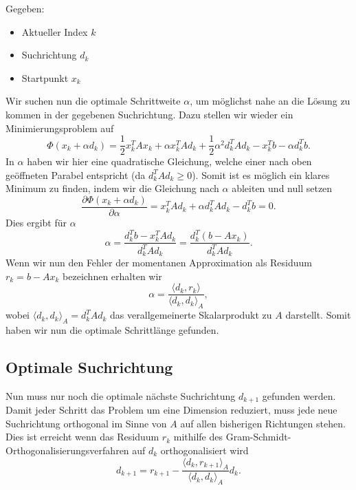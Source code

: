 Gegeben: 
\begin{itemize}
	\item Aktueller Index $k$
	\item Suchrichtung $d_k$
	\item Startpunkt $x_k$
\end{itemize}
Wir suchen nun die optimale Schrittweite $\alpha$, um möglichst nahe an die Lösung zu kommen in der gegebenen Suchrichtung.
Dazu stellen wir wieder ein Minimierungsproblem auf
\begin{equation}
	\Phi(x_k + \alpha d_k) 
	= 
	\frac{1}{2} x_k^T A x_k + \alpha x_k^T A d_k + \frac{1}{2} {\alpha}^2 d_k^T A d_k
	-
	x_k^T b - \alpha d_k^T b .
\end{equation}
In $\alpha$ haben wir hier eine quadratische Gleichung, welche einer nach oben geöffneten Parabel entspricht (da $d_k^T A d_k \ge 0$).
Somit ist es möglich ein klares Minimum zu finden, indem wir die Gleichung nach $\alpha$ ableiten und null setzen
\begin{equation}
\frac{\partial \Phi(x_k + \alpha d_k) }{\partial \alpha}
= 
x_k^T A d_k + \alpha  d_k^T A d_k - d_k^T b
=
0 .
\end{equation}
Dies ergibt für $\alpha$ 
\begin{equation}
\alpha
= 
\frac{d_k^T b - x_k^T A d_k}{d_k^T A d_k}
=
\frac{d_k^T \left(b - A x_k\right)}{d_k^T A d_k}.
\end{equation}
Wenn wir nun den Fehler der momentanen Approximation als Residuum $r_k = b - A x_k$ bezeichnen erhalten wir
\begin{equation}
\alpha
= 
\frac{\langle d_k , r_k \rangle}{\langle d_k , d_k \rangle_A},
\end{equation}
wobei $\langle d_k , d_k \rangle_A = d_k^T A d_k$ das verallgemeinerte Skalarprodukt zu $A$ darstellt.
Somit haben wir nun die optimale Schrittlänge gefunden.

\subsection{Optimale Suchrichtung \label{cg:subsection:suchrichtung}}

Nun muss nur noch die optimale nächste Suchrichtung $d_{k+1}$ gefunden werden.
Damit jeder Schritt das Problem um eine Dimension reduziert, muss jede neue Suchrichtung orthogonal im Sinne von $A$ auf allen bisherigen Richtungen stehen. %
Dies ist erreicht wenn das Residuum $r_k$ mithilfe des Gram-Schmidt-Orthogonalisierungsverfahren auf $d_k$ orthogonalisiert wird %
\begin{equation}
d_{k+1}
= 
r_{k+1} - \frac{\langle d_k , r_{k+1} \rangle_A}{\langle d_k , d_k \rangle_A} d_k.
\end{equation}
